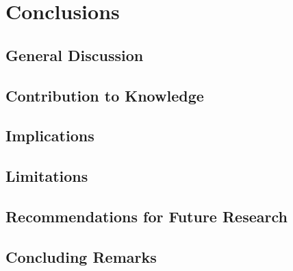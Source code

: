 \chapter{Conclusions}
\label{ch:conc}

\section{General Discussion}

\section{Contribution to Knowledge}

\section{Implications}

\section{Limitations}

\section{Recommendations for Future Research}

\section{Concluding Remarks}
